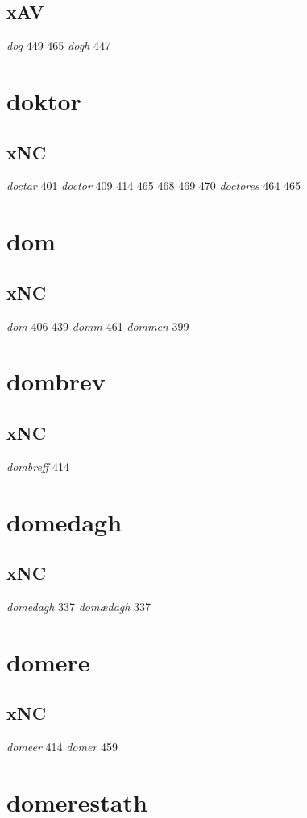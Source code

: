 \documentclass[a4paper,twocolumn]{article}
\begin{document}
\subsection{xAV}
\label{sec:orgd8b6085}
\emph{dog} 449 465 \emph{dogh} 447 
\section{doktor}
\label{sec:org092c275}
\subsection{xNC}
\label{sec:org5bf55f3}
\emph{doctar} 401 \emph{doctor} 409 414 465 468 469 470 \emph{doctores} 464 465 
\section{dom}
\label{sec:org8f62af9}
\subsection{xNC}
\label{sec:org18ad4df}
\emph{dom} 406 439 \emph{domm} 461 \emph{dommen} 399 
\section{dombrev}
\label{sec:org50d4f97}
\subsection{xNC}
\label{sec:orga31e1c9}
\emph{dombreff} 414 
\section{domedagh}
\label{sec:orgc397ef4}
\subsection{xNC}
\label{sec:org4ae013b}
\emph{domedagh} 337 \emph{domædagh} 337 
\section{domere}
\label{sec:org09125f2}
\subsection{xNC}
\label{sec:orge487ba1}
\emph{domeer} 414 \emph{domer} 459 
\section{domerestath}
\label{sec:orge82b6e9}
\end{document}
